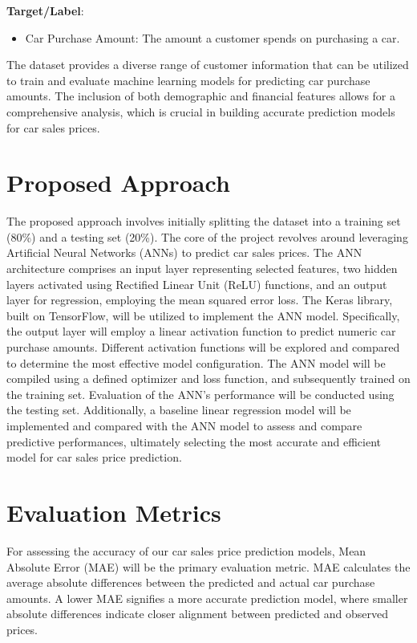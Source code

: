 \documentclass[manuscript,screen,review,nonacm]{acmart}
\begin{document}
\textbf{Target/Label}:
\begin{itemize}
    \item Car Purchase Amount: The amount a customer spends on purchasing a car.
\end{itemize}


The dataset provides a diverse range of customer information that can be utilized to train and evaluate machine learning models for predicting car purchase amounts. The inclusion of both demographic and financial features allows for a comprehensive analysis, which is crucial in building accurate prediction models for car sales prices. 

\section{Proposed Approach}
The proposed approach involves initially splitting the dataset into a training set (80\%) and a testing set (20\%). The core of the project revolves around leveraging Artificial Neural Networks (ANNs) to predict car sales prices. The ANN architecture comprises an input layer representing selected features, two hidden layers activated using Rectified Linear Unit (ReLU) functions, and an output layer for regression, employing the mean squared error loss. The Keras library, built on TensorFlow, will be utilized to implement the ANN model. Specifically, the output layer will employ a linear activation function to predict numeric car purchase amounts. Different activation functions will be explored and compared to determine the most effective model configuration. The ANN model will be compiled using a defined optimizer and loss function, and subsequently trained on the training set. Evaluation of the ANN's performance will be conducted using the testing set. Additionally, a baseline linear regression model will be implemented and compared with the ANN model to assess and compare predictive performances, ultimately selecting the most accurate and efficient model for car sales price prediction.


\section{Evaluation Metrics}
For assessing the accuracy of our car sales price prediction models, Mean Absolute Error (MAE) will be the primary evaluation metric. MAE calculates the average absolute differences between the predicted and actual car purchase amounts. A lower MAE signifies a more accurate prediction model, where smaller absolute differences indicate closer alignment between predicted and observed prices. 

 
\end{document}
